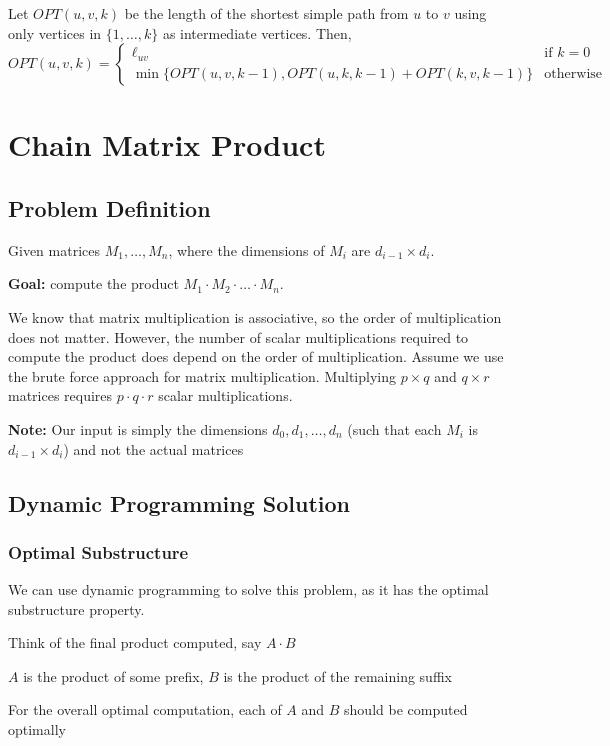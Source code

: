 Let $OPT(u, v, k)$ be the length of the shortest simple path from $u$ to $v$ using only vertices in $\{1, \dots, k\}$ as intermediate vertices. Then, \[
    OPT(u, v, k) = \begin{cases}
        \ell_{uv}                                                     & \text{if } k = 0 \\
        \min\{OPT(u, v, k - 1), OPT(u, k, k - 1) + OPT(k, v, k - 1)\} & \text{otherwise}
    \end{cases}
\]

\section{Chain Matrix Product}

\subsection{Problem Definition}

\begin{listu}
    \item Given matrices $M_1, \dots, M_n$, where the dimensions of $M_i$ are $d_{i - 1} \times d_i$.
    \item \textbf{Goal:} compute the product $M_1 \cdot M_2 \cdot \dots \cdot M_n$. 
\end{listu}

We know that matrix multiplication is associative, so the order of multiplication does not matter. However, the number of scalar multiplications required to compute the product does depend on the order of multiplication. Assume we use the brute force approach for matrix multiplication. Multiplying $p \times q$ and $q \times r$ matrices requires $p \cdot q \cdot r$ scalar multiplications.

\textbf{Note:} Our input is simply the dimensions $d_0, d_1, \dots , d_n$ (such that each $M_i$ is $d_{i-1} \times d_i$) and not the actual matrices

\subsection{Dynamic Programming Solution}

\subsubsection{Optimal Substructure}

We can use dynamic programming to solve this problem, as it has the optimal substructure property.
\begin{listu}
    \item Think of the final product computed, say $A \cdot B$
    \item $A$ is the product of some prefix, $B$ is the product of the remaining suffix
    \item For the overall optimal computation, each of $A$ and $B$ should be computed optimally
\end{listu}


